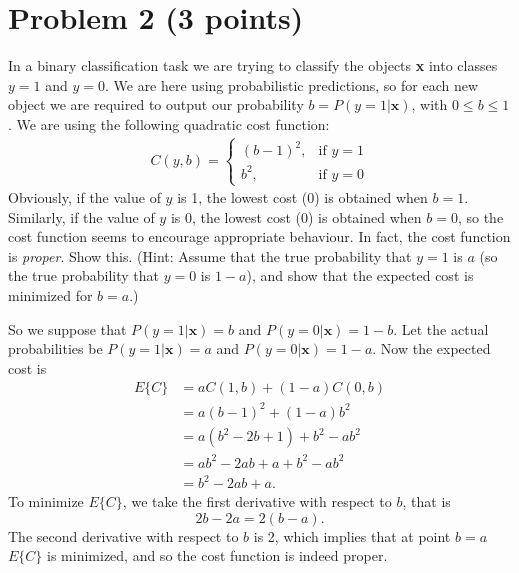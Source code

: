\documentclass[10pt]{article}
\begin{document}
\section*{Problem 2 (3 points)}
In a binary classification task we are trying to classify the objects \textbf{x} into classes $y = 1$ and $y = 0$. We are here using probabilistic predictions, so for each new object we are required to output our probability $b = P(y = 1 | \textbf{x})$, with $0 \leq b \leq 1$. We are using the following quadratic cost function:
\begin{align}
C(y, b) = 
\begin{cases}
(b - 1)^2,  & \mbox{if } y = 1\\
b^2,          & \mbox{if } y = 0
\end{cases}
\end{align}
Obviously, if the value of $y$ is 1, the lowest cost (0) is obtained when $b = 1$. Similarly, if the value of $y$ is 0, the lowest cost (0) is obtained when $b = 0$, so the cost function seems to encourage appropriate behaviour. In fact, the cost function is \textit{proper}. Show this. (Hint: Assume that the true probability that $y = 1$ is $a$ (so the true probability that $y = 0$ is $1 - a$), and show that the expected cost is minimized for $b = a$.)

\color{black}
\noindent So we suppose that $P(y = 1 | \textbf{x}) = b$ and $P(y = 0 | \textbf{x}) = 1 - b$. Let the actual probabilities be $P(y = 1 | \textbf{x}) = a$ and $P(y = 0 | \textbf{x}) = 1 - a$. Now the expected cost is
\begin{align*}
E\{C\} &= aC(1, b) + (1 - a)C(0, b) \\
           &= a(b - 1)^2 + (1 - a)b^2 \\
           &= a(b^2 - 2b + 1) + b^2 - ab^2 \\
           &= ab^2 - 2ab + a + b^2 - ab^2 \\
           &= b^2 - 2ab + a.
\end{align*}
To minimize $E\{C\}$, we take the first derivative with respect to $b$, that is
\[
2b - 2a = 2(b - a).
\]
The second derivative with respect to $b$ is 2, which implies that at point $b = a$ $E\{C\}$ is minimized, and so the cost function is indeed proper.

\color{blue}
\end{document}

